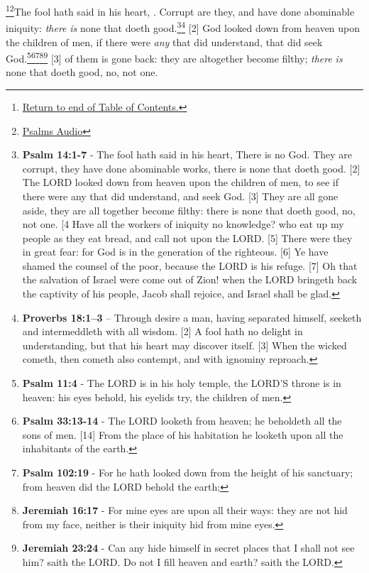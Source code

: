 \footnote{\textcolor[cmyk]{0.99998,1,0,0}{\hyperlink{TOC}{Return to end of Table of Contents.}}}\footnote{\href{https://audiobible.com/bible/psalms_53.html}{\textcolor[cmyk]{0.99998,1,0,0}{Psalms  Audio}}}\textcolor[cmyk]{0.99998,1,0,0}{The fool hath said in his heart, . Corrupt are they, and have done abominable iniquity: \emph{there} \emph{is} none that doeth good.}\footnote{\textbf{Psalm 14:1-7} - The fool hath said in his heart, There is no God. They are corrupt, they have done abominable works, there is none that doeth good. [2] The LORD looked down from heaven upon the children of men, to see if there were any that did understand, and seek God. [3] They are all gone aside, they are all together become filthy: there is none that doeth good, no, not one. [4 Have all the workers of iniquity no knowledge? who eat up my people as they eat bread, and call not upon the LORD. [5] There were they in great fear: for God is in the generation of the righteous. [6] Ye have shamed the counsel of the poor, because the LORD is his refuge. [7] Oh that the salvation of Israel were come out of Zion! when the LORD bringeth back the captivity of his people, Jacob shall rejoice, and Israel shall be glad.}\footnote{\textbf{Proverbs 18:1--3} -- Through desire a man, having separated himself, seeketh and intermeddleth with all wisdom.  [2]  A fool hath no delight in understanding, but that his heart may discover itself. [3] When the wicked cometh, then cometh also contempt, and with ignominy reproach.}
[2] \textcolor[cmyk]{0.99998,1,0,0}{God looked down from heaven upon the children of men,  if there were \emph{any} that did understand, that did seek God.}\footnote{\textbf{Psalm 11:4} - The LORD is in his holy temple, the LORD'S throne is in heaven: his eyes behold, his eyelids try, the children of men.}\footnote{\textbf{Psalm 33:13-14} - The LORD looketh from heaven; he beholdeth all the sons of men. [14] From the place of his habitation he looketh upon all the inhabitants of the earth.}\footnote{\textbf{Psalm 102:19} - For he hath looked down from the height of his sanctuary; from heaven did the LORD behold the earth;}\footnote{\textbf{Jeremiah 16:17} - For mine eyes are upon all their ways: they are not hid from my face, neither is their iniquity hid from mine eyes.}\footnote{\textbf{Jeremiah 23:24} - Can any hide himself in secret places that I shall not see him? saith the LORD. Do not I fill heaven and earth? saith the LORD.}
[3] \textcolor[cmyk]{0.99998,1,0,0}{ of them is gone back: they are altogether become filthy; \emph{there} \emph{is} none that doeth good, no, not one.}
